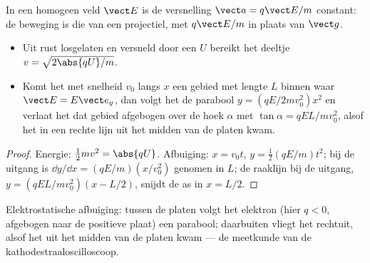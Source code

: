 \begin{proposition}\label{prop:b1:charged-particles:efield}
In een homogeen veld $\vect E$ is de versnelling $\vect a = q\vect E/m$
constant: de beweging is die van een projectiel, met $q\vect E/m$ in plaats
van $\vect g$.
\begin{itemize}
  \item Uit rust losgelaten en versneld door een  $U$ bereikt het
        deeltje $v = \sqrt{2\abs{qU}/m}$.
  \item Komt het met snelheid $v_0$ langs $x$ een gebied met lengte $L$ binnen waar
        $\vect E = E\vect e_y$, dan volgt het de parabool $y = (qE/2mv_0^2)x^2$
        en verlaat het dat gebied afgebogen over de hoek $\alpha$ met $\tan\alpha =
        qEL/mv_0^2$, alsof het in een rechte lijn uit het
        midden van de platen kwam.
\end{itemize}
\end{proposition}

\begin{proof}
Energie: $\tfrac12 mv^2 = \abs{qU}$. Afbuiging: $x = v_0t$, $y =
\tfrac12(qE/m)t^2$; bij de uitgang is $\dd y/\dd x = (qE/m)(x/v_0^2)$ genomen
in $L$; de raaklijn bij de uitgang, $y = (qEL/mv_0^2)(x - L/2)$, snijdt de
as in $x = L/2$.
\end{proof}

\begin{omfigure}

{\small Elektrostatische afbuiging: tussen de platen volgt het elektron (hier
$q < 0$, afgebogen naar de positieve plaat) een parabool; daarbuiten
vliegt het rechtuit, alsof het uit het midden van de platen kwam
--- de meetkunde van de kathodestraaloscilloscoop.}
\end{omfigure}

